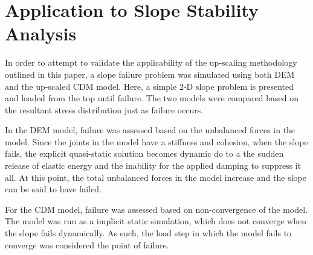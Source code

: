 \section{Application to Slope Stability Analysis}

In order to attempt to validate the applicability of the up-scaling methodology outlined in this paper, a slope failure problem was simulated using both DEM and the up-scaled CDM model. Here, a simple 2-D slope problem is presented and loaded from the top until failure. The two models were compared based on the resultant stress distribution just as failure occurs. 

In the DEM model, failure was assessed based on the unbalanced forces in the model. Since the joints in the model have a stiffness and cohesion, when the slope fails, the explicit quasi-static solution becomes dynamic do to a the sudden release of elastic energy and the inability for the applied damping to suppress it all. At this point, the total unbalanced forces in the model increase and the slope can be said to have failed. 

For the CDM model, failure was assessed based on non-convergence of the model. The model was run as a implicit static simulation, which does not converge when the slope fails dynamically. As such, the load step in which the model fails to converge was considered the point of failure.
